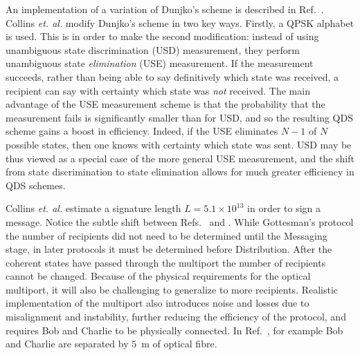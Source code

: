 An implementation of a variation of Dunjko's scheme is described in Ref.~\cite{Collins2014}. Collins \emph{et. al.} modify Dunjko's scheme in two key ways. Firstly, a QPSK alphabet is used. This is in order to make the second modification: instead of using unambiguous state discrimination (USD) measurement, they perform unambiguous state \emph{elimination} (USE) measurement. If the measurement succeeds, rather than being able to say definitively which state was received, a recipient can say with certainty which state was \emph{not} received. %
The main advantage of the USE measurement scheme is that the probability that the measurement fails is significantly smaller than for USD, and so the resulting QDS scheme gains a boost in efficiency. Indeed, if the USE eliminates $N-1$ of $N$ possible states, then one knows with certainty which state was sent. USD may be thus viewed as a special case of the more general USE measurement, and the shift from state discrimination to state elimination allows for much greater efficiency in QDS schemes. %


Collins \emph{et. al.} estimate a signature length $L = 5.1 \times 10^{13}$ in order to sign a message. Notice the subtle shift between Refs.~\cite{Gottesman2001} and \cite{Andersson2006, Clarke2012, Dunjko2014, Collins2014}. While Gottesman's protocol the number of recipients did not need to be determined until the Messaging stage, in later protocols it must be determined before Distribution. After the coherent states have passed through the multiport the number of recipients cannot be changed. 
Because of the physical requirements for the optical multiport, it will also be challenging to generalize to more recipients. %
Realistic implementation of the multiport also introduces noise and losses due to misalignment and instability, further reducing the efficiency of the protocol, and requires Bob and Charlie to be physically connected. In Ref.~\cite{Clarke2012, Collins2014}, for example Bob and Charlie are separated by $5$~m of optical fibre. 




